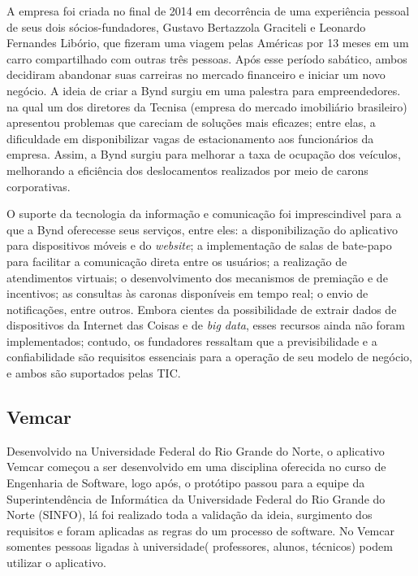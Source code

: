 A empresa foi criada no final de 2014 em decorrência de uma experiência pessoal de seus dois sócios-fundadores, Gustavo Bertazzola Graciteli e Leonardo Fernandes Libório, que fizeram uma viagem pelas Américas por 13 meses em um carro compartilhado com outras três pessoas. Após esse período sabático, ambos decidiram abandonar suas carreiras no mercado financeiro e iniciar um novo negócio. A ideia de criar a Bynd surgiu em uma palestra para empreendedores. na qual um dos diretores da Tecnisa (empresa do mercado imobiliário brasileiro) apresentou problemas que careciam de soluções mais eficazes; entre elas, a dificuldade em disponibilizar vagas de estacionamento aos funcionários da empresa. Assim, a Bynd surgiu para melhorar a taxa de ocupação dos veículos, melhorando a eficiência dos deslocamentos realizados por meio de carons corporativas.


O suporte da tecnologia da informação e comunicação foi imprescindivel para a que a Bynd oferecesse seus serviços, entre eles: a disponibilização do aplicativo para dispositivos móveis e do \textit{website}; a implementação de salas de bate-papo para facilitar a comunicação direta entre os usuários; a realização de atendimentos virtuais; o desenvolvimento dos mecanismos de premiação e de incentivos; as consultas às caronas disponíveis em tempo real; o envio de notificações, entre outros. Embora cientes da possibilidade de extrair dados de dispositivos da Internet das Coisas e de \textit{big data}, esses recursos ainda não foram implementados; contudo, os fundadores ressaltam que a previsibilidade e a confiabilidade são requisitos essenciais para a operação de seu modelo de negócio, e ambos são suportados pelas TIC. 


\subsection{Vemcar}

Desenvolvido na Universidade Federal do Rio Grande do Norte, o aplicativo Vemcar começou a ser desenvolvido em uma disciplina oferecida no curso de Engenharia de Software, logo após, o protótipo passou para a equipe da Superintendência de Informática da Universidade Federal do Rio Grande do Norte (SINFO), lá foi realizado toda a validação da ideia, surgimento dos requisitos e foram aplicadas as regras do um processo de software. No Vemcar somentes pessoas ligadas à universidade( professores, alunos, técnicos) podem utilizar o aplicativo.

